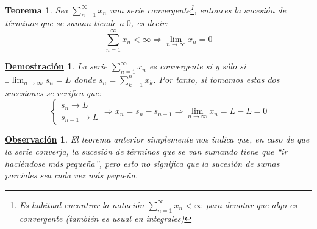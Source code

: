 \documentclass[10pt,a4paper,openright]{book}
\theoremstyle{break}
\newtheorem{theo}{Teorema}[chapter]
\newtheorem*{demo}{\underline{Demostración}}
\newtheorem{obs}{\underline{Observación}}[chapter]
\begin{document}
\begin{theo}
Sea $\sum_{n=1}^\infty x_n$ una serie convergente\footnote{Es habitual encontrar la notación $\sum_{n=1}^\infty x_n < \infty$ para denotar que algo es convergente (también es usual en integrales)}, entonces la sucesión de términos que se suman tiende a $0$, es decir:
$$\sum_{n=1}^{\infty} x_n <\infty \Rightarrow \lim_{n \rightarrow \infty} x_n =0$$
\end{theo}
\begin{demo}
La serie $\sum_{n=1}^{\infty} x_n$ es convergente si y sólo si $\exists \lim_{n \to \infty} s_n = L$ donde $s_n = \sum_{k=1}^{n} x_k$. Por tanto, si tomamos estas dos sucesiones se verifica que:
$$
\begin{cases}
s_n \rightarrow L \\
s_{n-1} \rightarrow L
\end{cases}
\Rightarrow x_n = s_n - s_{n-1} \Rightarrow \lim_{n\rightarrow\infty} x_n = L - L = 0
$$
\end{demo}

\begin{obs}
El teorema anterior simplemente nos indica que, en caso de que la serie converja, la sucesión de términos que se van sumando tiene que ``ir haciéndose más pequeña'', pero esto no significa que la sucesión de sumas parciales sea cada vez más pequeña.
\end{obs}
\end{document}
